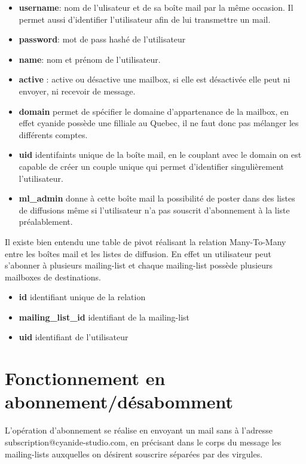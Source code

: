 \begin{itemize}
	\item \textbf{username}: nom de l'ulisateur et de sa boîte mail par la même occasion. Il permet aussi d'identifier l'utilisateur afin de lui transmettre un mail.
	\item \textbf{password}: mot de pass hashé de l'utilisateur
	\item \textbf{name}: nom et prénom de l'utilisateur.
	\item \textbf{active} : active ou désactive une mailbox, si elle est désactivée elle peut ni envoyer, ni recevoir de message.
	\item \textbf{domain} permet de spécifier le domaine d'appartenance de la mailbox, en effet cyanide possède une filliale au Quebec, il ne faut donc pas mélanger les différents comptes.
	\item \textbf{uid} identifaints unique de la boîte mail, en le couplant avec le domain on est capable de créer un couple unique qui permet d'identifier singulièrement l'utilisateur.
	\item \textbf{ml\_admin} donne à cette boîte mail la possibilité de poster dans des listes de diffusions même si l'utilisateur n'a pas souscrit d'abonnement à la liste préalablement.
\end{itemize}

Il existe bien entendu une table de pivot réalisant la relation Many-To-Many entre les boîtes mail et les listes de diffusion. En effet un utilisateur peut s'abonner à plusieurs mailing-list et chaque mailing-list possède plusieurs mailboxes de destinations.

\begin{itemize}
	\item \textbf{id} identifiant unique de la relation
	\item \textbf{mailing\_list\_id} identifiant de la mailing-list
	\item \textbf{uid} identifiant de l'utilisateur
\end{itemize}

\section*{Fonctionnement en abonnement/désabomment}

L'opération d'abonnement se réalise en envoyant un mail sans à l'adresse subscription@cyanide-studio.com, en précisant dans le corps du message les mailing-lists auxquelles on désirent souscrire séparées par des virgules.

